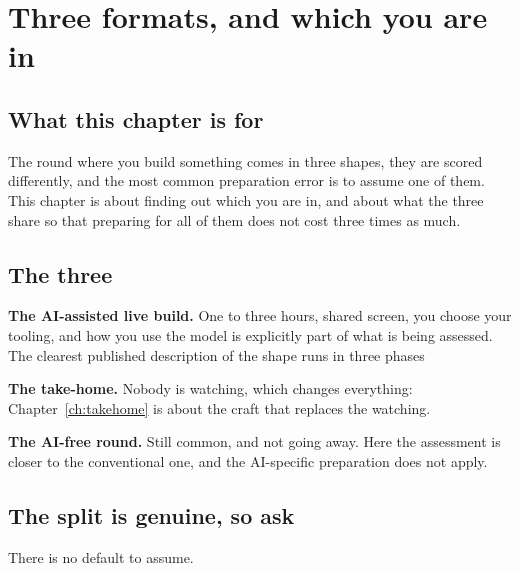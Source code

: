 \chapter{Three formats, and which you are in}
\label{ch:formats}

\section*{What this chapter is for}

The round where you build something comes in three shapes, they are scored
differently, and the most common preparation error is to assume one of them.
This chapter is about finding out which you are in, and about what the three
share so that preparing for all of them does not cost three times as much.

\section{The three}

\textbf{The AI-assisted live build.} One to three hours, shared screen, you
choose your tooling, and how you use the model is explicitly part of what is
being assessed. The clearest published description of the shape runs in three
phases \dash{} 

\textbf{The take-home.}  Nobody is watching, which changes everything:
Chapter~\ref{ch:takehome} is about the craft that replaces the watching.

\textbf{The AI-free round.} Still common, and not going away.
 Here the
assessment is closer to the conventional one, and the AI-specific preparation
does not apply.

\section{The split is genuine, so ask}

There is no default to assume. 

